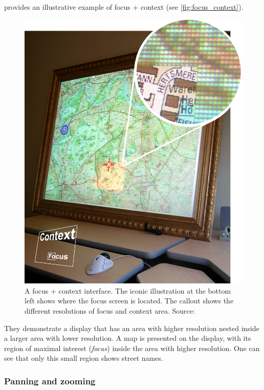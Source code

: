 \cite{Baudisch2002} provides an illustrative example of focus + context (see \autoref{fig:focus_context}).
\begin{figure}[!]
\centering
\includegraphics[width=\textwidth]{img/FullsizeMap}
\caption{A focus + context interface. 
The iconic illustration at the bottom left shows where the focus screen is located. 
The callout shows the different resolutions of focus and context area. Source: \cite{Baudisch2002}}
\label{fig:focus_context}
\end{figure}
They demonstrate a display that has an area with higher resolution nested inside a larger area with lower resolution.
A map is presented on the display, with its region of maximal interest (\textit{focus}) inside the area with higher resolution.
One can see that only this small region shows street names.


\subsubsection{Panning and zooming}
\label{subsubsec:panning_and_zooming}

